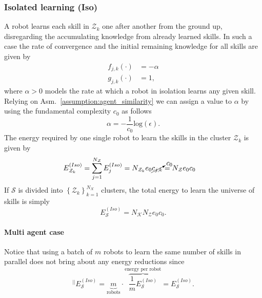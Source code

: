 \subsubsection{\textbf{Isolated learning (Iso)}} A robot learns each skill in $\mathcal{Z}_k$ one after another from the ground up, disregarding the accumulating knowledge from already learned skills. In such a case the rate of convergence and the initial remaining knowledge for all skills are given by
\begin{subequations}\label{eq:fg_isolated}
	\begin{alignat}{2}
		f_{j,k}\left(\cdot \right) &=  -\alpha \\
		g_{j,k}\left(\cdot \right) &= 1,
	\end{alignat}
\end{subequations}
where $ \alpha>0$ models the rate at which a robot in isolation learns any given skill. Relying on Asm.~\ref{assumption:agent_similarity} we can assign a value to $\alpha$ by using the fundamental complexity $c_0$ as follows
\begin{equation}\label{eq:isolated_learning_rate}
	\alpha = -\frac{1}{c_0}\text{log}(\epsilon).
\end{equation}
The energy required by one single robot to learn the skills in the cluster $\mathcal{Z}_k$ is given by
 \begin{align}
     \begin{split}
       E^{(Iso)}_{\mathcal{Z}_k} &= \sum_{j=1}^{N_{\mathcal{Z}}} E^{(Iso)}_j= N_{\mathcal{Z}_k}  e_{0} \cancelto{c_{0}}{c_{j,k}} = N_{\mathcal{Z}} e_{0}  c_0
     \end{split}
 \end{align}
If $\mathcal{S}$ is divided into $\left\lbrace \mathcal{Z}_k \right\rbrace^{N_\mathcal{K}}_{k=1} $ clusters, the total energy to learn the universe of skills is simply
\begin{equation}
	E^{(Iso)}_{\mathcal{S}} = N_\mathcal{K} N_{\mathcal{Z}} e_{0}  c_0.
\end{equation}
\paragraph*{Multi agent case}
Notice that using a batch of $m$ robots to learn the same number of skills in parallel does not bring about any energy reductions since
\begin{equation}
    ^{\lvert \lvert}E^{(Iso)}_\mathcal{S}= \underbrace{m}_{\text{robots}}\cdot \overbrace{\frac{1}{m}E^{(Iso)}_\mathcal{S}}^{\text{energy per robot}} = E^{(Iso)}_\mathcal{S}.
\end{equation}


